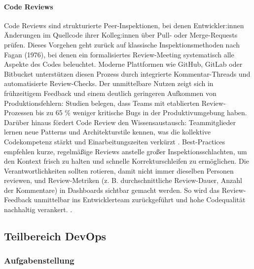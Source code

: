 \paragraph{Code Reviews}
Code Reviews sind strukturierte Peer-Inspektionen, bei denen Entwickler:innen Änderungen im Quellcode ihrer Kolleg:innen über Pull- oder Merge-Requests prüfen. 
Dieses Vorgehen geht zurück auf klassische Inspektionsmethoden nach Fagan (1976), bei denen ein formalisiertes Review-Meeting systematisch alle Aspekte des Codes beleuchtet.\cite{fagan1976design}
Moderne Plattformen wie GitHub, GitLab oder Bitbucket unterstützen diesen Prozess durch integrierte Kommentar-Threads und automatisierte Review-Checks. \cite{atlassian2024code,cohen2010business}
\newline
Der unmittelbare Nutzen zeigt sich in frühzeitigem Feedback und einem deutlich geringeren Aufkommen von Produktionsfehlern: 
Studien belegen, dass Teams mit etablierten Review-Prozessen bis zu 65 \% weniger kritische Bugs in der Produktivumgebung haben.\cite{bacchelli2013expectations}
Darüber hinaus fördert Code Review den Wissensaustausch: Teammitglieder lernen neue Patterns und Architekturstile kennen, was die kollektive Codekompetenz stärkt und Einarbeitungszeiten verkürzt \cite{rigby2013modern}.
\newline
Best-Practices empfehlen kurze, regelmäßige Reviews anstelle großer Inspektionsschlachten, um den Kontext frisch zu halten und schnelle Korrekturschleifen zu ermöglichen. 
Die Verantwortlichkeiten sollten rotieren, damit nicht immer dieselben Personen reviewen, und Review-Metriken (z. B. durchschnittliche Review-Dauer, Anzahl der Kommentare) in Dashboards sichtbar gemacht werden.
So wird das Review-Feedback unmittelbar ins Entwicklerteam zurückgeführt und hohe Codequalität nachhaltig verankert. \cite{atlassian2024code,rigby2013modern}.

\subsection{Teilbereich DevOps}

\subsubsection{Aufgabenstellung}

